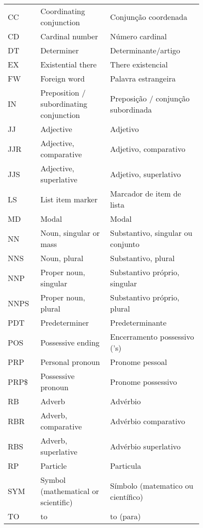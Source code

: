 \begin{longtable}{|p{0.1\linewidth}|p{0.3\linewidth}|p{0.4\linewidth}|}
        \hline
        CC & Coordinating conjunction & Conjunção coordenada\\
        CD & Cardinal number & Número cardinal\\
        DT & Determiner & Determinante/artigo\\
        EX & Existential there & There existencial\\
        FW & Foreign word & Palavra estrangeira\\
        IN & Preposition / subordinating conjunction & Preposição / conjunção subordinada\\
        JJ & Adjective & Adjetivo\\
        JJR & Adjective, comparative & Adjetivo, comparativo\\
        JJS & Adjective, superlative & Adjetivo, superlativo\\
        LS & List item marker & Marcador de item de lista\\
        MD & Modal & Modal\\
        NN & Noun, singular or mass & Substantivo, singular ou conjunto\\
        NNS & Noun, plural & Substantivo, plural\\
        NNP & Proper noun, singular & Substantivo próprio, singular\\
        NNPS & Proper noun, plural & Substantivo próprio, plural\\
        PDT & Predeterminer & Predeterminante\\
        POS & Possessive ending & Encerramento possessivo ('s)\\
        PRP & Personal pronoun & Pronome pessoal\\
        PRP\$ & Possessive pronoun & Pronome possessivo\\
        RB & Adverb & Advérbio\\
        RBR & Adverb, comparative & Advérbio comparativo\\
        RBS & Adverb, superlative & Advérbio superlativo\\
        RP & Particle & Particula\\
        SYM & Symbol (mathematical or scientific) & Símbolo (matematico ou científico)\\
        TO & to & to (para)\\

\end{longtable}
